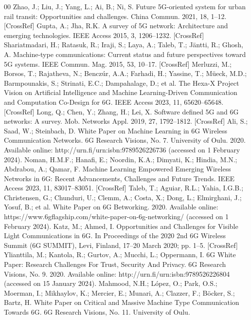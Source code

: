 \documentclass[conference]{IEEEtran}
\begin{document}
\begin{thebibliography}{00}
 Zhao, J.; Liu, J.; Yang, L.; Ai, B.; Ni, S. Future 5G-oriented system for urban rail transit: Opportunities and challenges. China Commun. 2021, 18, 1–12. [CrossRef]
 Gupta, A.; Jha, R.K. A survey of 5G network: Architecture and emerging technologies. IEEE Access 2015, 3, 1206–1232. [CrossRef]
 Shariatmadari, H.; Ratasuk, R.; Iraji, S.; Laya, A.; Taleb, T.; Jäntti, R.; Ghosh, A. Machine-type communications: Current status and future perspectives toward 5G systems. IEEE Commun. Mag. 2015, 53, 10–17. [CrossRef]
 Merluzzi, M.; Borsos, T.; Rajatheva, N.; Benczúr, A.A.; Farhadi, H.; Yassine, T.; Müeck, M.D.; Barmpounakis, S.; Strinati, E.C.; Dampahalage, D.; et al. The Hexa-X Project Vision on Artificial Intelligence and Machine Learning-Driven Communication and Computation Co-Design for 6G. IEEE Access 2023, 11, 65620–65648. [CrossRef]
 Long, Q.; Chen, Y.; Zhang, H.; Lei, X. Software defined 5G and 6G networks: A survey. Mob. Networks Appl. 2019, 27, 1792–1812. [CrossRef]
 Ali, S.; Saad, W.; Steinbach, D. White Paper on Machine Learning in 6G Wireless Communication Networks. 6G Research Visions, No. 7. University of Oulu. 2020. Available online: http://urn.fi/urn:isbn:9789526226736 (accessed on 1 February 2024).
 Noman, H.M.F.; Hanafi, E.; Noordin, K.A.; Dimyati, K.; Hindia, M.N.; Abdrabou, A.; Qamar, F. Machine Learning Empowered Emerging Wireless Networks in 6G: Recent Advancements, Challenges and Future Trends. IEEE Access 2023, 11, 83017–83051. [CrossRef]
 Taleb, T.; Aguiar, R.L.; Yahia, I.G.B.; Christensen, G.; Chunduri, U.; Clemm, A.; Costa, X.; Dong, L.; Elmirghani, J.; Yosuf, B.; et al. White Paper on 6G Betworking. 2020. Available online: https://www.6gflagship.com/white-paper-on-6g-networking/ (accessed on 1 February 2024).
 Katz, M.; Ahmed, I. Opportunities and Challenges for Visible Light Communications in 6G. In Proceedings of the 2020 2nd 6G Wireless Summit (6G SUMMIT), Levi, Finland, 17–20 March 2020; pp. 1–5. [CrossRef]
 Ylianttila, M.; Kantola, R.; Gurtov, A.; Mucchi, L.; Oppermann, I. 6G White Paper: Research Challenges For Trust, Security And Privacy. 6G Research Visions, No. 9. 2020. Available online: http://urn.fi/urn:isbn:9789526226804 (accessed on 15 January 2024).
 Mahmood, N.H.; López, O.; Park, O.S.; Moerman, I.; Mikhaylov, K.; Mercier, E.; Munari, A.; Clazzer, F.; Böcker, S.; Bartz, H. White Paper on Critical and Massive Machine Type Communication Towards 6G. 6G Research Visions, No. 11. University of Oulu.

\end{thebibliography}
\end{document}

